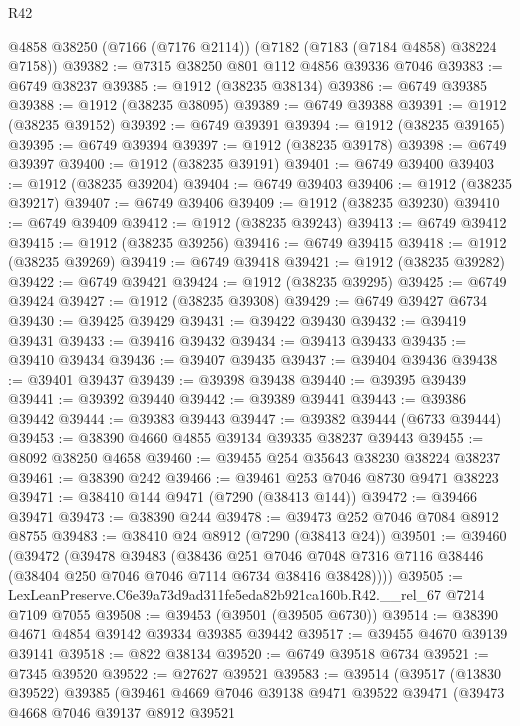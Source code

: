 \begin{lexlean}{R42}
\begin{coremodule}
{    @4858
    @38250
    (@7166 (@7176 @2114))
    (@7182 (@7183 (@7184 @4858) @38224 @7158))
@39382 := @7315 @38250 @801 @112 @4856 @39336 @7046
@39383 := @6749 @38237
@39385 := @1912 (@38235 @38134)
@39386 := @6749 @39385
@39388 := @1912 (@38235 @38095)
@39389 := @6749 @39388
@39391 := @1912 (@38235 @39152)
@39392 := @6749 @39391
@39394 := @1912 (@38235 @39165)
@39395 := @6749 @39394
@39397 := @1912 (@38235 @39178)
@39398 := @6749 @39397
@39400 := @1912 (@38235 @39191)
@39401 := @6749 @39400
@39403 := @1912 (@38235 @39204)
@39404 := @6749 @39403
@39406 := @1912 (@38235 @39217)
@39407 := @6749 @39406
@39409 := @1912 (@38235 @39230)
@39410 := @6749 @39409
@39412 := @1912 (@38235 @39243)
@39413 := @6749 @39412
@39415 := @1912 (@38235 @39256)
@39416 := @6749 @39415
@39418 := @1912 (@38235 @39269)
@39419 := @6749 @39418
@39421 := @1912 (@38235 @39282)
@39422 := @6749 @39421
@39424 := @1912 (@38235 @39295)
@39425 := @6749 @39424
@39427 := @1912 (@38235 @39308)
@39429 := @6749 @39427 @6734
@39430 := @39425 @39429
@39431 := @39422 @39430
@39432 := @39419 @39431
@39433 := @39416 @39432
@39434 := @39413 @39433
@39435 := @39410 @39434
@39436 := @39407 @39435
@39437 := @39404 @39436
@39438 := @39401 @39437
@39439 := @39398 @39438
@39440 := @39395 @39439
@39441 := @39392 @39440
@39442 := @39389 @39441
@39443 := @39386 @39442
@39444 := @39383 @39443
@39447 := @39382 @39444 (@6733 @39444)
@39453 := @38390 @4660 @4855 @39134 @39335 @38237 @39443
@39455 := @8092 @38250 @4658
@39460 := @39455 @254 @35643 @38230 @38224 @38237
@39461 := @38390 @242
@39466 := @39461 @253 @7046 @8730 @9471 @38223
@39471 := @38410 @144 @9471 (@7290 (@38413 @144))
@39472 := @39466 @39471
@39473 := @38390 @244
@39478 := @39473 @252 @7046 @7084 @8912 @8755
@39483 := @38410 @24 @8912 (@7290 (@38413 @24))
@39501 := @39460
    (@39472
      (@39478
        @39483
        (@38436
          @251
          @7046
          @7048
          @7316
          @7116
          @38446
          (@38404 @250 @7046 @7046 @7114 @6734 @38416 @38428))))
@39505 := LexLeanPreserve.C6e39a73d9ad311fe5eda82b921ca160b.R42.__rel_67 @7214 @7109 @7055
@39508 := @39453 (@39501 (@39505 @6730))
@39514 := @38390 @4671 @4854 @39142 @39334 @39385 @39442
@39517 := @39455 @4670 @39139 @39141
@39518 := @822 @38134
@39520 := @6749 @39518 @6734
@39521 := @7345 @39520
@39522 := @27627 @39521
@39583 := @39514
    (@39517
      (@13830 @39522)
      @39385
      (@39461
        @4669
        @7046
        @39138
        @9471
        @39522
        @39471
        (@39473
          @4668
          @7046
          @39137
          @8912
          @39521
}
\end{coremodule}
\end{lexlean}
